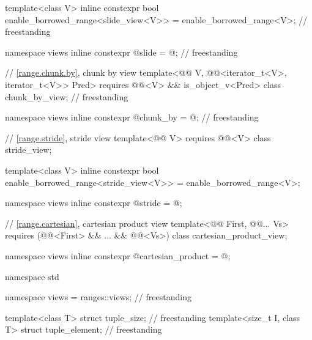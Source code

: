 \begin{codeblock}
{  template<class V>
    inline constexpr bool enable_borrowed_range<slide_view<V>> =
      enable_borrowed_range<V>;                                                     // freestanding

  namespace views { inline constexpr @\unspecnc@ slide = @\unspecnc@; }             // freestanding

  // \ref{range.chunk.by}, chunk by view
  template<@@ V, @@<iterator_t<V>, iterator_t<V>> Pred>
    requires @@<V> && is_object_v<Pred>
  class chunk_by_view;                                                              // freestanding

  namespace views { inline constexpr @\unspecnc@ chunk_by = @\unspecnc@; }          // freestanding

  // \ref{range.stride}, stride view
  template<@@ V>
    requires @@<V>
  class stride_view;

  template<class V>
    inline constexpr bool enable_borrowed_range<stride_view<V>> = enable_borrowed_range<V>;

  namespace views { inline constexpr @\unspecnc@ stride = @\unspecnc@; }

  // \ref{range.cartesian}, cartesian product view
  template<@@ First, @@... Vs>
    requires (@@<First> && ... && @@<Vs>)
  class cartesian_product_view;

  namespace views { inline constexpr @\unspecnc@ cartesian_product = @\unspecnc@; }
}

namespace std {
  namespace views = ranges::views;                                                  // freestanding

  template<class T> struct tuple_size;                                              // freestanding
  template<size_t I, class T> struct tuple_element;                                 // freestanding

}
\end{codeblock}
